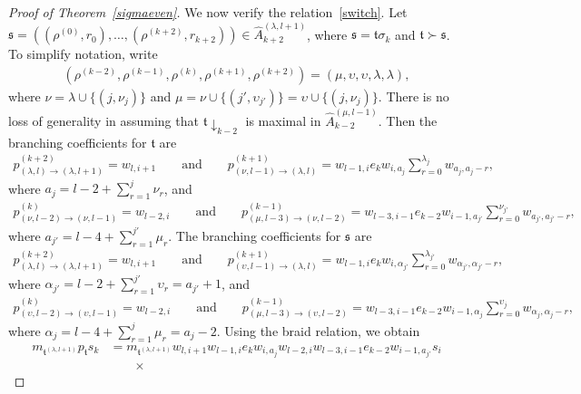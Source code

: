 \documentclass[11pt,a4paper,reqno,svgnames]{amsart}
\theoremstyle{plain}
\theoremstyle{definition}
\numberwithin{equation}{section}
\begin{document}
\begin{proof}[Proof of Theorem~\ref{sigmaeven}]
We now verify the relation~\eqref{switch}. Let $\mathfrak{s}=((\rho^{(0)},r_0),\ldots,(\rho^{(k+2)},r_{k+2}))\in \hat{A}_{k+2}^{(\lambda,l+1)}$, where $\mathfrak{s}=\mathfrak{t}\sigma_k$ and $\mathfrak{t}\succ\mathfrak{s}$. To simplify notation, write
\begin{align*}
(\rho^{(k-2)},\rho^{(k-1)},\rho^{(k)},\rho^{(k+1)},\rho^{(k+2)})=
(\mu,\upsilon,\upsilon,\lambda,\lambda),
\end{align*}
where $\nu=\lambda\cup{\lbrace}(j,\nu_j){\rbrace}$ and $\mu=\nu\cup{\lbrace}(j',\upsilon_{j'}){\rbrace}=\upsilon\cup{\lbrace}(j,\nu_j){\rbrace}$. There is no loss of generality in assuming that $\mathfrak{t}\downarrow_{k-2}$ is maximal in $\hat{A}_{k-2}^{(\mu,l-1)}$. Then the branching coefficients for $\mathfrak{t}$ are 
\begin{align*}
p_{(\lambda,l)\to(\lambda,l+1)}^{(k+2)}
=w_{l,i+1}\qquad\text{and}\qquad 
p_{(\nu,l-1)\to(\lambda,l)}^{(k+1)}=
w_{l-1,i}e_{k}w_{i,a_j}\sum_{r=0}^{\lambda_j}w_{a_j,a_j-r},
\end{align*}
where $a_j= l -2+\sum_{r=1}^j\nu_r$, and 
\begin{align*}
p_{(\nu,l-2)\to(\nu,l-1)}^{(k)}=w_{l-2,i} \qquad\text{and}\qquad 
p_{(\mu,l-3)\to(\nu,l-2)}^{(k-1)}=w_{l-3,i-1}e_{k-2}w_{i-1,a_{j'}}\sum_{r=0}^{\nu_{j'}}
w_{a_{j'},a_{j'}-r},
\end{align*}
where $a_{j'}= l-4+\sum_{r=1}^{j'}\mu_r$. The branching coefficients for $\mathfrak{s}$ are 
\begin{align*}
p_{(\lambda,l)\to(\lambda,l+1)}^{(k+2)}
=w_{l,i+1}\qquad\text{and}\qquad
p_{(\upsilon,l-1)\to(\lambda,l)}^{(k+1)}
=
w_{l-1,i}e_kw_{i,\alpha_{j'}}
\sum_{r=0}^{\lambda_{j'}}w_{\alpha_{j'},\alpha_{j'}-r},
\end{align*}
where $\alpha_{j'}= l -2+\sum_{r=1}^{j'}\upsilon_r=a_{j'}+1$, and 
\begin{align*}
p_{(\upsilon,l-2)\to(\upsilon,l-1)}^{(k)}=w_{l-2,i} \qquad\text{and}\qquad
p_{(\mu,l-3)\to(\upsilon,l-2)}^{(k-1)}= w_{ l -3,i-1}e_{k-2}w_{i-1,\alpha_{j}}
\sum_{r=0}^{\upsilon_{j}}w_{\alpha_{j},\alpha_{j}-r},
\end{align*}
where $\alpha_{j}= l -4+\sum_{r=1}^{j}\mu_r=a_{j}-2$. Using the braid relation, we obtain
\begin{equation*}
\begin{split}
m_{\mathfrak{t}^{(\lambda,l+1)}}p_\mathfrak{t}s_{k}
&=m_{\mathfrak{t}^{(\lambda,l+1)}} w_{l,i+1}w_{l-1,i}e_{k}w_{i,a_j}w_{l-2,i}w_{l-3,i-1}e_{k-2}w_{i-1,a_{j'}}s_i\\
&\qquad\times 

\end{split}
\end{equation*}
\end{proof}
\end{document}
